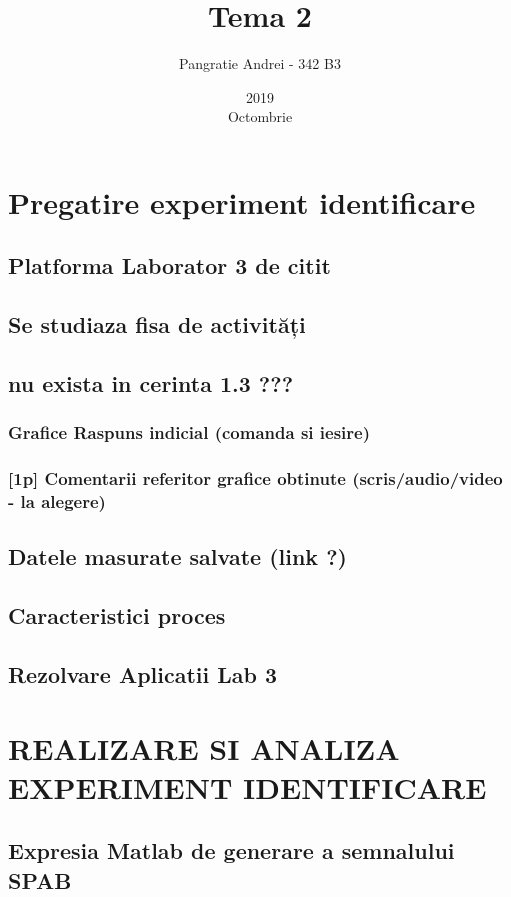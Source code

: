 \documentclass[12pt,english]{article}
\title{Tema 2}
\date{2019\\ Octombrie}
\author{Pangratie Andrei - 342 B3}
\begin{document}
\maketitle
\newpage

\tableofcontents
\newpage

\section { Pregatire experiment identificare }
\subsection { Platforma Laborator 3 de citit }
\subsection { Se studiaza fisa de activități }
\subsection { nu exista in cerinta 1.3 ??? }
\subsubsection { Grafice Raspuns indicial (comanda si iesire) }
\subsubsection { [1p] Comentarii referitor grafice obtinute (scris/audio/video - la alegere) }
\subsection { Datele masurate salvate (link ?) }
\subsection { Caracteristici proces }
\subsection { Rezolvare Aplicatii Lab 3 }

\section { REALIZARE SI ANALIZA EXPERIMENT IDENTIFICARE }
\subsection { Expresia Matlab de generare a semnalului SPAB }
\end{document}
